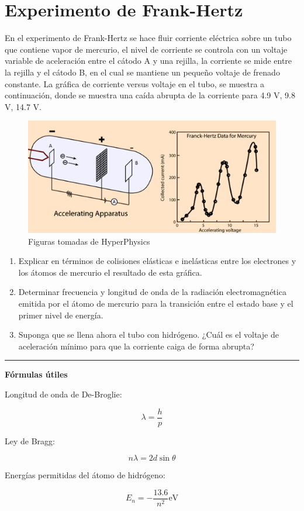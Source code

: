 \documentclass[12pt]{article}
\begin{document}
\section{Experimento de Frank-Hertz}

En el experimento de Frank-Hertz se hace fluir corriente eléctrica sobre un tubo que contiene
vapor de mercurio, el nivel de corriente se controla con un voltaje variable de aceleración entre el
cátodo A y una rejilla, la corriente se mide entre la rejilla y el cátodo B, en el cual se mantiene un
pequeño voltaje de frenado constante. La gráfica de corriente versus voltaje en el tubo, se muestra
a continuación, donde se muestra una caída abrupta de la corriente para 4.9 V, 9.8 V, 14.7 V.

	\begin{figure}[h!]
		\centering
	\includegraphics[scale=1, angle=0]{frank}
	\caption{Figuras tomadas de HyperPhysics}
\end{figure}

\begin{enumerate}
	\item Explicar en términos de colisiones elásticas e inelásticas entre los electrones y los átomos de
	mercurio el resultado de esta gráfica.
	\item  Determinar frecuencia y longitud de onda de la radiación electromagnética emitida por el átomo
	de mercurio para la transición entre el estado base y el primer nivel de energía.
	\item Suponga que se llena ahora el tubo con hidrógeno. ¿Cuál es el voltaje de aceleración mínimo para que la
	corriente caiga de forma abrupta?
\end{enumerate}

\noindent\rule{16.5cm}{0.4pt}








\begin{center}
	\textbf{Fórmulas útiles}
\end{center}

Longitud de onda de De-Broglie:

\begin{equation*}
\lambda = \frac{h}{p}
\end{equation*}

Ley de Bragg:

\begin{equation}
n\lambda = 2 d \sin\theta
\end{equation}

Energías permitidas del átomo de hidrógeno:

\begin{equation*}
E_n = - \frac{13.6}{n^2} \text{eV}
\end{equation*}
\end{document}
